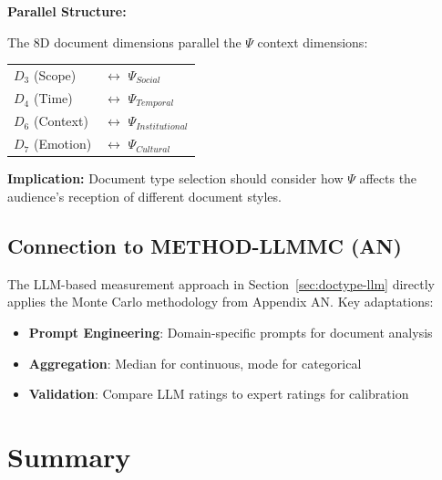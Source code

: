 \begin{tcolorbox}[colback=yellow!5!white, colframe=yellow!75!black,
    title=Integration: METHOD-DOCTYPE $\leftrightarrow$ CORE-WHEN]

\textbf{Parallel Structure:}

The 8D document dimensions parallel the $\Psi$ context dimensions:

\begin{center}
\begin{tabular}{ll}
$D_3$ (Scope) & $\leftrightarrow$ $\Psi_{Social}$ \\
$D_4$ (Time) & $\leftrightarrow$ $\Psi_{Temporal}$ \\
$D_6$ (Context) & $\leftrightarrow$ $\Psi_{Institutional}$ \\
$D_7$ (Emotion) & $\leftrightarrow$ $\Psi_{Cultural}$ \\
\end{tabular}
\end{center}

\textbf{Implication:} Document type selection should consider how $\Psi$ affects
the audience's reception of different document styles.

\end{tcolorbox}

\subsection{Connection to METHOD-LLMMC (AN)}

The LLM-based measurement approach in Section~\ref{sec:doctype-llm} directly
applies the Monte Carlo methodology from Appendix AN. Key adaptations:

\begin{itemize}[nosep]
\item \textbf{Prompt Engineering}: Domain-specific prompts for document analysis
\item \textbf{Aggregation}: Median for continuous, mode for categorical
\item \textbf{Validation}: Compare LLM ratings to expert ratings for calibration
\end{itemize}


\section{Summary}
\label{sec:doctype-summary}

